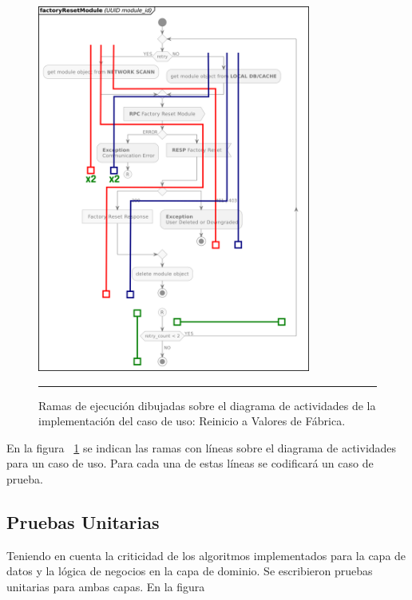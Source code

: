 \begin{figure}[htbp]
	\centering
	\includegraphics[width=0.8\textwidth]{Figures/iter2/ACT_factoryResetModule_branches_ink.png}
	\rule{35em}{1pt}
	\caption[Class Diagram]{Ramas de ejecución dibujadas sobre el diagrama de actividades de la implementación del caso de uso: Reinicio a Valores de Fábrica.}
	\label{fig:act_act_test_branches}
\end{figure}

En la figura ~\ref{fig:act_act_test_branches} se indican las ramas con líneas sobre el diagrama de actividades para un caso de uso. Para cada una de estas líneas se codificará un caso de prueba.

\subsection{Pruebas Unitarias}
Teniendo en cuenta la criticidad de los algoritmos implementados para la capa de datos y la lógica de negocios en la capa de dominio. Se escribieron pruebas unitarias para ambas capas. En la figura %

